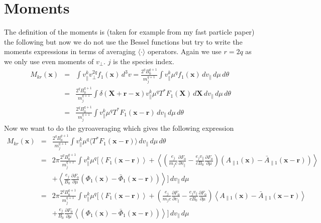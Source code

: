 \section{Moments}
The definition of the moments is (taken for example from my fast
particle paper) the following but now we do not use the Bessel
functions but try to write the moments expressions in terms of
averaging $\langle\cdot\rangle$ operators. Again we use $r=2q$ as we
only use even moments of $v_\bot$. $j$ is the species index.
\begin{eqnarray*}
  M_{kr}(\mathbf{x}) &=& \int v_\|^kv_\bot^{2q} f_1(\mathbf{x})\,d^3v
  =\frac{2^qB_0^{q+1}}{m_j^{q+1}}\int v_\|^k \mu^q f_1(\mathbf{x})\,dv_\|\,d\mu\,d\theta\\
  &=&\frac{2^qB_0^{q+1}}{m_j^{q+1}}
  \int \delta(\mathbf{X}+\mathbf{r}-\mathbf{x}) v_\|^k \mu^q T^*F_1(\mathbf{X})\,d\mathbf{X}\,dv_\|\,d\mu\,d\theta\\
  &=&\frac{2^qB_0^{q+1}}{m_j^{q+1}}
  \int v_\|^k \mu^q
  T^*F_1(\mathbf{x}-\mathbf{r})\,dv_\|\,d\mu\,d\theta
\end{eqnarray*}
Now we want to do the gyroaveraging which gives the following
expression
\begin{eqnarray*}
  M_{kr}(\mathbf{x}) &=&\frac{2^qB_0^{q+1}}{m_j^{q+1}}
  \int v_\|^k \mu^q \langle T^*F_1(\mathbf{x}-\mathbf{r})\rangle\,dv_\|\,d\mu\,d\theta\\
  &=&2\pi\frac{2^qB_0^{q+1}}{m_j^{q+1}}
  \int v_\|^k \mu^q \Bigg[
    \left\langle
      F_1(\mathbf{x}-\mathbf{r})
    \right\rangle
    +\left\langle
      \left(
        \frac{e_j}{m_jc}\frac{\partial F_0}{\partial v_\|}
        -\frac{e_jv_\|}{cB_0}\frac{\partial F_0}{\partial \mu}
      \right)\left(
        A_{\|1}(\mathbf{x})
        -\bar{A}_{\|1}(\mathbf{x}-\mathbf{r})
      \right)
    \right\rangle\\
    &&+\left\langle
      \frac{e_j}{B_0}\frac{\partial F_0}{\partial\mu}\left(
        \Phi_1(\mathbf{x})
        -\bar{\Phi}_1(\mathbf{x}-\mathbf{r})
      \right)
    \right\rangle
  \Bigg]\,dv_\|\,d\mu\\
  &=&2\pi\frac{2^qB_0^{q+1}}{m_j^{q+1}}
  \int v_\|^k \mu^q \Bigg[
    \left\langle
      F_1(\mathbf{x}-\mathbf{r})
    \right\rangle
    +\left(
      \frac{e_j}{m_jc}\frac{\partial F_0}{\partial v_\|}
      -\frac{e_jv_\|}{cB_0}\frac{\partial F_0}{\partial \mu}
    \right)\left\langle
      A_{\|1}(\mathbf{x})
      -\bar{A}_{\|1}(\mathbf{x}-\mathbf{r})
    \right\rangle\\
    &&+\frac{e_j}{B_0}\frac{\partial F_0}{\partial\mu}\left\langle
      \left(
        \Phi_1(\mathbf{x})
        -\bar{\Phi}_1(\mathbf{x}-\mathbf{r})
      \right)
    \right\rangle
  \Bigg]\,dv_\|\,d\mu
\end{eqnarray*}
